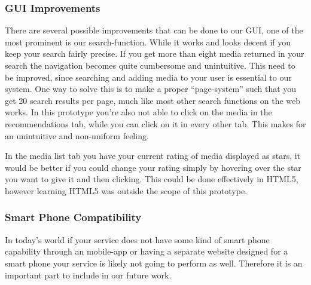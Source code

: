 \subsubsection{GUI Improvements}
There are several possible improvements that can be done to our GUI, one of the most prominent is our search-function. While it works and looks decent if you keep your search fairly precise. If you get more than eight media returned in your search the navigation becomes quite cumbersome and unintuitive. This need to be improved, since searching and adding media to your user is essential to our system. One way to solve this is to make a proper “page-system” such that you get 20 search results per page, much like most other search functions on the web works.
In this prototype you're also not able to click on the media in the recommendations tab, while you can click on it in every other tab. This makes for an unintuitive and non-uniform feeling.

In the media list tab you have your current rating of media displayed as stars, it would be better if you could change your rating simply by hovering over the star you want to give it and then clicking. This could be done effectively in HTML5, however learning HTML5 was outside the scope of this prototype.

\subsubsection{Smart Phone Compatibility}
In today's world if your service does not have some kind of smart phone capability through an mobile-app or having a separate website designed for a smart phone your service is likely not going to perform as well. Therefore it is an important part to include in our future work.

